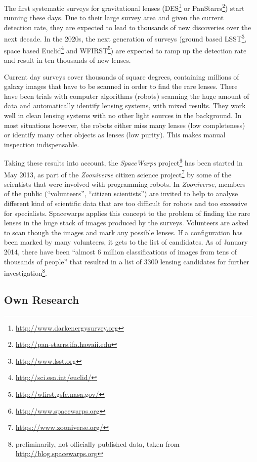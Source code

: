 \documentclass[11pt]{article}
\begin{document}
The first systematic surveys for gravitational lenses (DES\footnote{\url{http://www.darkenergysurvey.org}} or PanStarrs\footnote{\url{http://pan-starrs.ifa.hawaii.edu}}) start running these days.
Due to their large survey area and given the current detection rate, they are expected to lead to thousands of new discoveries over the next decade.
In the 2020s, the next generation of surveys (ground based LSST\footnote{\url{http://www.lsst.org}}, space based Euclid\footnote{\url{http://sci.esa.int/euclid/}} and WFIRST\footnote{\url{http://wfirst.gsfc.nasa.gov/}}) are expected to ramp up the detection rate and result in ten thousands of new lenses.

Current day surveys cover thousands of square degrees, containing millions of galaxy images that have to be scanned in order to find the rare lenses.
There have been trials with computer algorithms (robots) scanning the huge amount of data and automatically identify lensing systems\cite{robots}, with mixed results.
They work well in clean lensing systems with no other light sources in the background.
In most situations however, the robots either miss many lenses (low completeness) or identify many other objects as lenses (low purity).
This makes manual inspection indispensable.

Taking these results into account, the \emph{SpaceWarps} project\footnote{\url{http://www.spacewarps.org}} has been started in May 2013, as part of the \emph{Zooniverse} citizen science project\footnote{\url{https://www.zooniverse.org/}} by some of the scientists that were involved with programming robots.
In \emph{Zooniverse}, members of the public (``volunteers'', ``citizen scientists'') are invited to help to analyse different kind of scientific data that are too difficult for robots and too excessive for specialists.
Spacewarps applies this concept to the problem of finding the rare lenses in the huge stack of images produced by the surveys.
Volunteers are asked to scan though the images and mark any possible lenses.
If a configuration has been marked by many volunteers, it gets to the list of candidates.
As of January 2014, there have been ``almost 6 million classifications of images from tens of thousands of people'' that resulted in a list of 3300 lensing candidates for further investigation\footnote{preliminarily, not officially published data, taken from \url{http://blog.spacewarps.org}}.



\subsection{Own Research}
\end{document}
